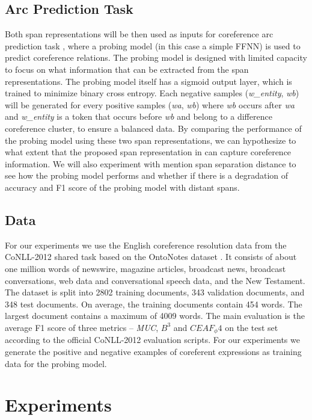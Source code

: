 \documentclass[11pt]{article}
\begin{document}
\subsection{Arc Prediction Task}

Both span representations will be then used as inputs for coreference arc prediction task \cite{liu2019linguistic}, where a probing model (in this case a simple FFNN) is used to predict coreference relations. The probing model is designed with limited capacity to focus on what information that can be extracted from the span representations. The probing model itself has a sigmoid output layer, which is trained to minimize binary cross entropy. Each negative samples (\textit{w\_entity}, \textit{wb}) will be generated for every positive samples (\textit{wa}, \textit{wb}) where \textit{wb} occurs after \textit{wa} and \textit{w\_entity} is a token that occurs before \textit{wb} and belong to a difference coreference cluster, to ensure a balanced data. By comparing the performance of the probing model using these two span representations, we can hypothesize to what extent that the proposed span representation in \textcite{joshi2019coref}  can capture coreference information. We will also experiment with mention span separation distance to see how the probing model performs and whether if there is a degradation of accuracy and F1 score of the probing model with distant spans.

\subsection{Data} 
For our experiments we use the English coreference resolution data
from the CoNLL-2012 shared task based on the OntoNotes dataset \parencite{conll}. It consists of about one million words of newswire, magazine articles, broadcast news, broadcast conversations, web data and conversational speech data, and the New Testament. The dataset is split into 2802 training documents, 343 validation documents, and 348 test documents. On average, the training documents contain 454 words. The largest document contains a maximum of 4009 words. The main evaluation is the average F1 score of three metrics – \textit{MUC}, $B^3$ and $CEAF_ \phi4$ on the test set according to the official CoNLL-2012 evaluation scripts. For our experiments we generate the positive and negative examples of coreferent expressions as training data for the probing model. 


\section{Experiments}
\end{document}
